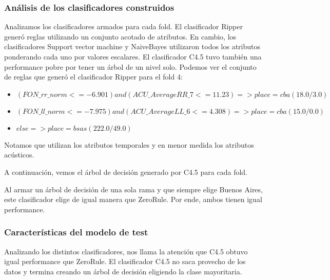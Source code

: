 \subsubsection{Análisis de los clasificadores construidos}

Analizamos los clasificadores armados para cada fold. El clasificador Ripper generó reglas utilizando un conjunto acotado de atributos. En cambio, los clasificadores Support vector machine y NaiveBayes utilizaron todos los atributos ponderando cada uno por valores escalares. El clasificador C4.5 tuvo también una performance pobre por tener un árbol de un nivel solo. Podemos ver el conjunto de reglas que generó el clasificador Ripper para el fold 4:

\begin{flushleft}
	\begin{itemize}
		\item $(FON\_rr\_norm <= -6.901) and (ACU\_AverageRR\_7 <= 11.23) => place=cba (18.0/3.0)$ \\
		\item $(FON\_ll\_norm <= -7.975) and (ACU\_AverageLL\_6 <= 4.308) => place=cba (15.0/0.0)$
		\item $else => place=bsas (222.0/49.0)$
	\end{itemize}
\end{flushleft}

Notamos que utilizan los atributos temporales y en menor medida los atributos acústicos.

A continuación, vemos el árbol de decisión generado por C4.5 para cada fold. 


Al armar un árbol de decisión de una sola rama y que siempre elige Buenos Aires, este clasificador elige de igual manera que ZeroRule. Por ende, ambos tienen igual performance.

\subsubsection{Características del modelo de test}


Analizando los distintos clasificadores, nos llama la atención que C4.5 obtuvo igual performance que ZeroRule. El clasificador C4.5 no saca provecho de los datos y termina creando un árbol de decisión eligiendo la clase mayoritaria.

